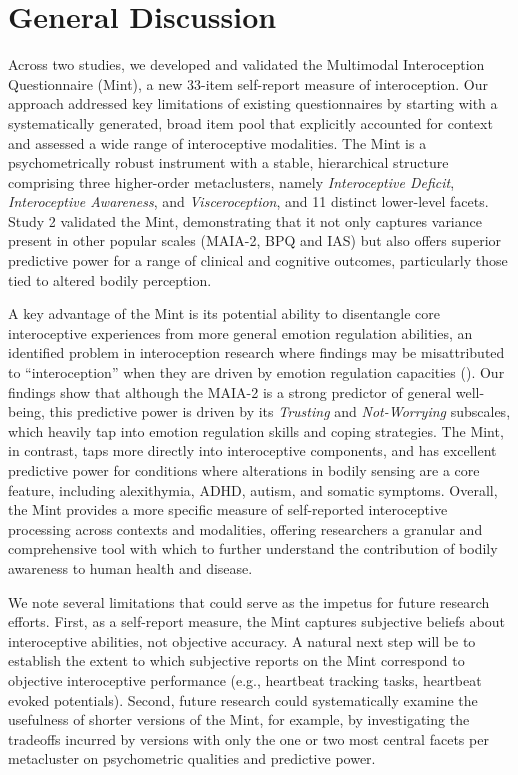 \documentclass[
  jou,
  floatsintext,
  longtable,
  nolmodern,
  notxfonts,
  notimes,
  colorlinks=true,linkcolor=blue,citecolor=blue,urlcolor=blue]{apa7}
\begin{document}
\section{General Discussion}\label{general-discussion}

Across two studies, we developed and validated the Multimodal
Interoception Questionnaire (Mint), a new 33-item self-report measure of
interoception. Our approach addressed key limitations of existing
questionnaires by starting with a systematically generated, broad item
pool that explicitly accounted for context and assessed a wide range of
interoceptive modalities. The Mint is a psychometrically robust
instrument with a stable, hierarchical structure comprising three
higher-order metaclusters, namely \emph{Interoceptive Deficit},
\emph{Interoceptive Awareness}, and \emph{Visceroception}, and 11
distinct lower-level facets. Study 2 validated the Mint, demonstrating
that it not only captures variance present in other popular scales
(MAIA-2, BPQ and IAS) but also offers superior predictive power for a
range of clinical and cognitive outcomes, particularly those tied to
altered bodily perception.

A key advantage of the Mint is its potential ability to disentangle core
interoceptive experiences from more general emotion regulation
abilities, an identified problem in interoception research where
findings may be misattributed to ``interoception'' when they are driven
by emotion regulation capacities
(). Our findings
show that although the MAIA-2 is a strong predictor of general
well-being, this predictive power is driven by its \emph{Trusting} and
\emph{Not-Worrying} subscales, which heavily tap into emotion regulation
skills and coping strategies. The Mint, in contrast, taps more directly
into interoceptive components, and has excellent predictive power for
conditions where alterations in bodily sensing are a core feature,
including alexithymia, ADHD, autism, and somatic symptoms. Overall, the
Mint provides a more specific measure of self-reported interoceptive
processing across contexts and modalities, offering researchers a
granular and comprehensive tool with which to further understand the
contribution of bodily awareness to human health and disease.

We note several limitations that could serve as the impetus for future
research efforts. First, as a self-report measure, the Mint captures
subjective beliefs about interoceptive abilities, not objective
accuracy. A natural next step will be to establish the extent to which
subjective reports on the Mint correspond to objective interoceptive
performance (e.g., heartbeat tracking tasks, heartbeat evoked
potentials). Second, future research could systematically examine the
usefulness of shorter versions of the Mint, for example, by
investigating the tradeoffs incurred by versions with only the one or
two most central facets per metacluster on psychometric qualities and
predictive power.
\end{document}
